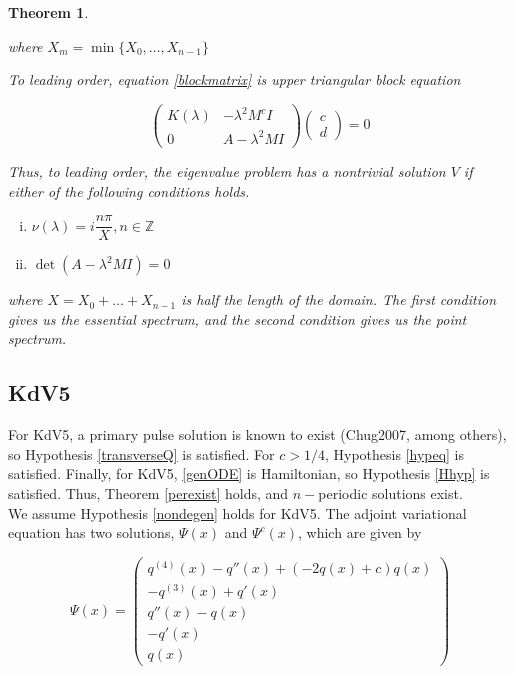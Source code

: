 \documentclass[12pt]{article}
\def\Z{{\mathbb Z}}
\newtheorem{theorem}{Theorem}
\begin{document}
\begin{theorem}
\begin{enumerate}
where $X_m = \min \{X_0, \dots, X_{n-1}\}$

\end{enumerate}

To leading order, equation \eqref{blockmatrix} is upper triangular block equation

\begin{equation}\label{blocktri}
\begin{pmatrix}
K(\lambda) & -\lambda^2 M^c I  \\
0 & A - \lambda^2 MI 
\end{pmatrix}
\begin{pmatrix}c \\ d \end{pmatrix} = 0
\end{equation}

Thus, to leading order, the eigenvalue problem has a nontrivial solution $V$ if either of the following conditions holds.

\begin{enumerate}[(i)]
\item $\nu(\lambda) = i \dfrac{n \pi}{X}, n \in \Z$ 
\item $\det(A - \lambda^2 MI) = 0$
\end{enumerate}

where $X = X_0 + \dots + X_{n-1}$ is half the length of the domain. The first condition gives us the essential spectrum, and the second condition gives us the point spectrum.

\end{theorem}

\subsection{KdV5}

For KdV5, a primary pulse solution is known to exist (Chug2007, among others), so Hypothesis \ref{transverseQ} is satisfied. For $c > 1/4$, Hypothesis \ref{hypeq} is satisfied. Finally, for KdV5, \eqref{genODE} is Hamiltonian, so Hypothesis \ref{Hhyp} is satisfied. Thus, Theorem \ref{perexist} holds, and $n-$periodic solutions exist.\\

We assume Hypothesis \ref{nondegen} holds for KdV5. The adjoint variational equation has two solutions, $\Psi(x)$ and $\Psi^c(x)$, which are given by

\begin{equation}\label{KdV5psi}
\Psi(x) = \begin{pmatrix}
q^{(4)}(x) - q''(x) + (-2q(x) + c)q(x)\\
-q^{(3)}(x) + q'(x) \\
q''(x) - q(x) \\
-q'(x) \\
q(x)
\end{pmatrix}
\end{equation}
\end{document}

